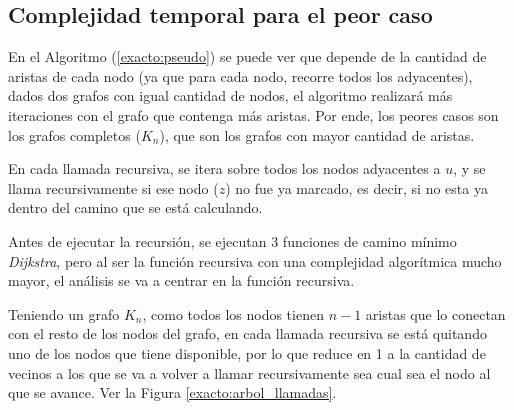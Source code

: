 \subsection{Complejidad temporal para el peor caso} \label{exacto:complejidad}

En el Algoritmo (\ref{exacto:pseudo}) se puede ver que depende de la cantidad de aristas de cada nodo (ya que para cada nodo, recorre todos los adyacentes), dados dos grafos
con igual cantidad de nodos, el algoritmo realizar\'a m\'as iteraciones con el grafo que contenga m\'as aristas. Por ende, los peores casos son los grafos completos ($K_n$),
que son los grafos con mayor cantidad de aristas.

En cada llamada recursiva, se itera sobre todos los nodos adyacentes a $u$, y se llama recursivamente si ese nodo ($z$) no fue ya marcado, es decir, si no esta ya dentro del camino que se est\'a calculando.

Antes de ejecutar la recursi\'on, se ejecutan 3 funciones de camino m\'inimo \emph{Dijkstra}, pero al ser la funci\'on recursiva con una complejidad algor\'itmica mucho mayor, el an\'alisis se va a centrar en la funci\'on recursiva.

Teniendo un grafo $K_n$, como todos los nodos tienen $n - 1$ aristas que lo conectan con el resto de los nodos del grafo, en cada llamada recursiva se est\'a quitando uno de los nodos que tiene disponible, por lo que reduce en 1 a la cantidad de vecinos a los que se va a volver a llamar recursivamente sea cual sea el nodo al que se avance. Ver la Figura \ref{exacto:arbol_llamadas}.

